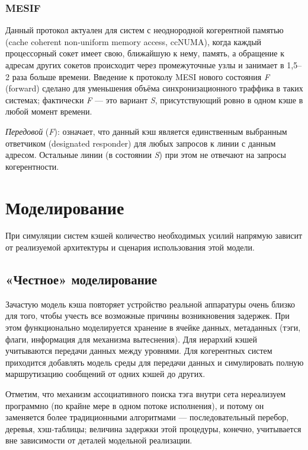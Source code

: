 \subsubsection{MESIF}

Данный протокол актуален для систем с неоднородной когерентной памятью (\abbr cache coherent non-uniform memory access, ccNUMA), когда каждый процессорный сокет имеет свою, ближайшую к нему, память, а обращение к адресам других сокетов происходит через промежуточные узлы и занимает в 1,5--2 раза больше времени. Введение к протоколу MESI нового состояния \textit{F} (\abbr forward) сделано для уменьшения объёма синхронизационного траффика в таких системах; фактически \textit{F} --- это вариант \textit{S}, присутствующий ровно в одном кэше в любой момент времени.
\begin{itemize*}
\item \textit{Передовой} (\textit{F}): означает, что данный кэш является единственным выбранным ответчиком (\abbr designated responder) для любых запросов к линии с данным адресом. Остальные линии (в состоянии \textit{S}) при этом не отвечают на запросы когерентности. 
\end{itemize*}

\section{Моделирование}

При симуляции систем кэшей количество необходимых усилий напрямую зависит от реализуемой архитектуры и сценария использования этой модели.

\subsection{«Честное» моделирование}

Зачастую модель кэша повторяет устройство реальной аппаратуры очень близко для того, чтобы учесть все возможные причины возникновения задержек. При этом функционально моделируется хранение в ячейке данных, метаданных (тэги, флаги, информация для механизма вытеснения). Для иерархий кэшей учитываются передачи данных между уровнями. Для когерентных систем приходится добавлять модель среды для передачи данных и симулировать полную маршрутизацию сообщений от одних кэшей до других.

Отметим, что механизм ассоциативного поиска тэга внутри сета нереализуем программно (по крайне мере в одном потоке исполнения), и потому он заменяется более традиционными алгоритмами --- последовательный перебор, деревья, хэш-таблицы; величина задержки этой процедуры, конечно, учитывается вне зависимости от деталей модельной реализации.


